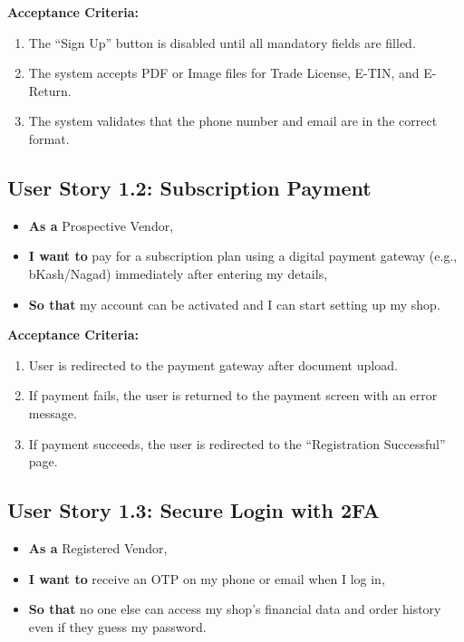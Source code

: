 \noindent\textbf{Acceptance Criteria:}
\begin{enumerate}
    \item The ``Sign Up'' button is disabled until all mandatory fields are filled.
    \item The system accepts PDF or Image files for Trade License, E-TIN, and E-Return.
    \item The system validates that the phone number and email are in the correct format.
\end{enumerate}

\vspace{1em}
\subsection*{User Story 1.2: Subscription Payment}
\begin{itemize}
    \item \textbf{As a} Prospective Vendor,
    \item \textbf{I want to} pay for a subscription plan using a digital payment gateway (e.g., bKash/Nagad) immediately after entering my details,
    \item \textbf{So that} my account can be activated and I can start setting up my shop.
\end{itemize}

\noindent\textbf{Acceptance Criteria:}
\begin{enumerate}
    \item User is redirected to the payment gateway after document upload.
    \item If payment fails, the user is returned to the payment screen with an error message.
    \item If payment succeeds, the user is redirected to the ``Registration Successful'' page.
\end{enumerate}

\vspace{1em}
\subsection*{User Story 1.3: Secure Login with 2FA}
\begin{itemize}
    \item \textbf{As a} Registered Vendor,
    \item \textbf{I want to} receive an OTP on my phone or email when I log in,
    \item \textbf{So that} no one else can access my shop's financial data and order history even if they guess my password.
\end{itemize}

